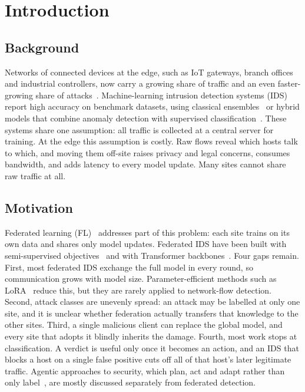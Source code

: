 \section{Introduction}

\subsection{Background}
Networks of connected devices at the edge, such as IoT gateways, branch
offices and industrial controllers, now carry a growing share of traffic and
an even faster-growing share of attacks~\cite{iot_survey}. Machine-learning
intrusion detection systems (IDS) report high accuracy on benchmark datasets,
using classical ensembles~\cite{pandit2023} or hybrid models that combine
anomaly detection with supervised classification~\cite{bayesh2024}. These
systems share one assumption: all traffic is collected at a central server
for training. At the edge this assumption is costly. Raw flows reveal which
hosts talk to which, and moving them off-site raises privacy and legal
concerns, consumes bandwidth, and adds latency to every model update. Many
sites cannot share raw traffic at all.

\subsection{Motivation}
Federated learning (FL)~\cite{mcmahan2017} addresses part of this problem:
each site trains on its own data and shares only model updates. Federated IDS
have been built with semi-supervised objectives~\cite{aouedi2022fluids} and
with Transformer backbones~\cite{devi2025fatvit}. Four gaps remain. First,
most federated IDS exchange the full model in every round, so communication
grows with model size. Parameter-efficient methods such as LoRA~\cite{hu2022lora}
reduce this, but they are rarely applied to network-flow detection. Second,
attack classes are unevenly spread: an attack may be labelled at only one
site, and it is unclear whether federation actually transfers that knowledge
to the other sites. Third, a single malicious client can replace the global
model, and every site that adopts it blindly inherits the damage. Fourth, most
work stops at classification. A verdict is useful only once it becomes an
action, and an IDS that blocks a host on a single false positive cuts off all
of that host's later legitimate traffic. Agentic approaches to security,
which plan, act and adapt rather than only label~\cite{panwar2025agentic},
are mostly discussed separately from federated detection.

